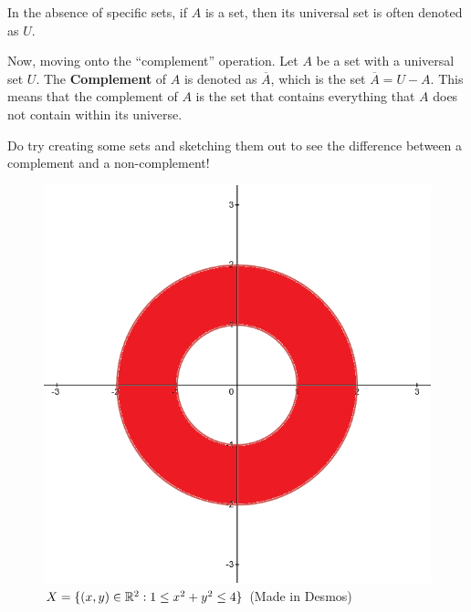\documentclass[../Latex-Setup/setup.tex]{subfiles}
\begin{document}
\indent In the absence of specific sets, if $A$ is a set, then its universal set is often denoted as $U$.\par

\indent Now, moving onto the ``complement'' operation. Let $A$ be a set with a universal set $U$.
The \textbf{Complement} of $A$ is denoted as $\overline{A}$, which is the set $\overline{A} = U - A$.
This means that the complement of $A$ is the set that contains everything that $A$ does not contain within its universe.\par

\indent Do try creating some sets and sketching them out to see the difference between a complement and a non-complement!\par

\begin{figure}[H]
    \begin{minipage}{0.45\textwidth}
    \centering
    \includegraphics[scale=0.45]{./images/Set-X.png}
    \caption{$X=\{(x,y) \in \mathbb R^2 : 1 \leq x^2 + y^2 \leq 4\}$ (Made in Desmos)}
    \end{minipage}\hfill
    \begin{minipage}{0.45\textwidth}
        \centering

\end{minipage}
\end{figure}
\end{document}
